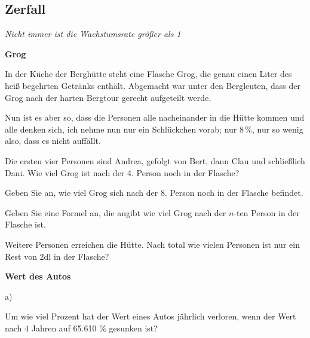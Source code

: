 \subsection{Zerfall}
\textit{Nicht immer ist die Wachstumsrate größer als 1}


\bbwActAufgabenNr{} \textbf{Grog}

In der Küche der Berghütte steht eine Flasche Grog, die genau einen Liter des
heiß begehrten Getränks enthält. Abgemacht war unter den Bergleuten,
dass der Grog nach der harten Bergtour gerecht aufgeteilt werde.

Nun ist es aber so, dass die Personen alle nacheinander in die Hütte
kommen und alle denken sich, ich nehme nun nur ein Schlückchen vorab; 
nur 8\,\%, nur so wenig also, dass es nicht auffällt.

\begin{bbwAufgabenBlock}

\item Die ersten vier Personen sind Andrea, gefolgt von Bert, dann
  Clau und schließlich Dani.
  Wie viel Grog ist nach der 4. Person noch in der Flasche?

\item Geben Sie an, wie viel Grog sich nach der 8. Person noch in der
  Flasche befindet.

\item Geben Sie eine Formel an, die angibt wie viel Grog nach der
  $n$-ten Person in der Flasche ist.
  
\item Weitere Personen erreichen die Hütte. Nach total wie vielen Personen
  ist nur ein Rest von 2dl in der Flasche?
\end{bbwAufgabenBlock}
\platzFuerBerechnungenBisEndeSeite{}


\bbwActAufgabenNr{} \textbf{Wert des Autos}

a)

Um wie viel Prozent hat der Wert eines Autos jährlich verloren, wenn
der Wert nach 4 Jahren auf 65.610 \% gesunken ist?

